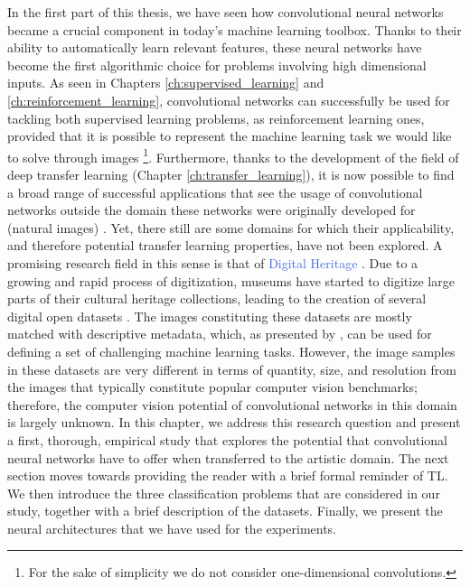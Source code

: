 In the first part of this thesis, we have seen how convolutional neural networks became a crucial component in today's machine learning toolbox. Thanks to their ability to automatically learn relevant features, these neural networks have become the first algorithmic choice for problems involving high dimensional inputs. As seen in Chapters \ref{ch:supervised_learning} and \ref{ch:reinforcement_learning}, convolutional networks can successfully be used for tackling both supervised learning problems, as reinforcement learning ones, provided that it is possible to represent the machine learning task we would like to solve through images \footnote{For the sake of simplicity we do not consider one-dimensional convolutions.}. Furthermore, thanks to the development of the field of deep transfer learning (Chapter \ref{ch:transfer_learning}), it is now possible to find a broad range of successful applications that see the usage of convolutional networks outside the domain these networks were originally developed for (natural images) \cite{kornblith2018better}. Yet, there still are some domains for which their applicability, and therefore potential transfer learning properties, have not been explored. A promising research field in this sense is that of \textcolor{RoyalBlue}{Digital Heritage} \cite{parry2005digital}. Due to a growing and rapid process of digitization, museums have started to digitize large parts of their cultural heritage collections, leading to the creation of several digital open datasets \cite{allen2000collaboration, mensink2014rijksmuseum}. The images constituting these datasets are mostly matched with descriptive metadata, which, as presented by \citet{mensink2014rijksmuseum}, can be used for defining a set of challenging machine learning tasks. However, the image samples in these datasets are very different in terms of quantity, size, and resolution from the images that typically constitute popular computer vision benchmarks; therefore, the computer vision potential of convolutional networks in this domain is largely unknown. In this chapter, we address this research question and present a first, thorough, empirical study that explores the potential that convolutional neural networks have to offer when transferred to the artistic domain. The next section moves towards providing the reader with a brief formal reminder of TL. We then introduce the three classification problems that are considered in our study, together with a brief description of the datasets. Finally, we present the neural architectures that we have used for the experiments. 

